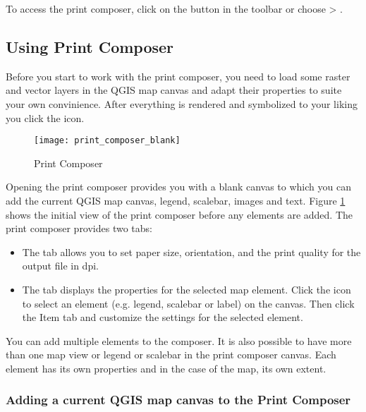 To access the print composer, click on the 
button in the toolbar or choose  > .

\subsection{Using Print Composer}\label{label_useprintcomposer} 

Before you start to work with the print composer, you need to load some 
raster and vector layers in the QGIS map canvas and adapt their properties 
to suite your own convinience. After everything is rendered and symbolized to 
your liking you click the  icon.

\begin{figure}[ht]
   \begin{center}
   \caption{Print Composer}\label{fig:print_composer_blank}\smallskip
   \texttt{[image: print\_composer\_blank]}
\end{center}  
\end{figure}

Opening the print composer provides you with a blank canvas to which you can 
add the current QGIS map canvas, legend, scalebar, images and text. Figure
\ref{fig:print_composer_blank} shows the initial view of the print composer 
before any elements are added. The print composer provides two tabs:

\begin{itemize}
\item The  tab allows you to set paper size, orientation, and the 
print quality for the output file in dpi.
\item The  tab displays the properties for the selected map element. 
Click the  
icon to select an element (e.g. legend, scalebar or label) on the canvas. 
Then click the Item tab and customize the settings for the selected 
element.
\end{itemize}

You can add multiple elements to the composer. It is also possible to have 
more than one map view or legend or scalebar in the print composer canvas. 
Each element has its own properties and in the case of the map, its own 
extent.

\subsubsection{Adding a current QGIS map canvas to the Print Composer}

